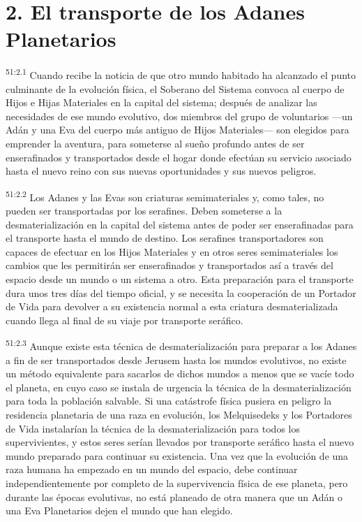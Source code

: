 \section*{2. El transporte de los Adanes Planetarios}
\par
\textsuperscript{51:2.1} Cuando recibe la noticia de que otro mundo habitado ha alcanzado el punto culminante de la evolución física, el Soberano del Sistema convoca al cuerpo de Hijos e Hijas Materiales en la capital del sistema; después de analizar las necesidades de ese mundo evolutivo, dos miembros del grupo de voluntarios ---un Adán y una Eva del cuerpo más antiguo de Hijos Materiales--- son elegidos para emprender la aventura, para someterse al sueño profundo antes de ser enserafinados y transportados desde el hogar donde efectúan su servicio asociado hasta el nuevo reino con sus nuevas oportunidades y sus nuevos peligros.

\par
\textsuperscript{51:2.2} Los Adanes y las Evas son criaturas semimateriales y, como tales, no pueden ser transportadas por los serafines. Deben someterse a la desmaterialización en la capital del sistema antes de poder ser enserafinadas para el transporte hasta el mundo de destino. Los serafines transportadores son capaces de efectuar en los Hijos Materiales y en otros seres semimateriales los cambios que les permitirán ser enserafinados y transportados así a través del espacio desde un mundo o un sistema a otro. Esta preparación para el transporte dura unos tres días del tiempo oficial, y se necesita la cooperación de un Portador de Vida para devolver a su existencia normal a esta criatura desmaterializada cuando llega al final de su viaje por transporte seráfico.

\par
\textsuperscript{51:2.3} Aunque existe esta técnica de desmaterialización para preparar a los Adanes a fin de ser transportados desde Jerusem hasta los mundos evolutivos, no existe un método equivalente para sacarlos de dichos mundos a menos que se vacíe todo el planeta, en cuyo caso se instala de urgencia la técnica de la desmaterialización para toda la población salvable. Si una catástrofe física pusiera en peligro la residencia planetaria de una raza en evolución, los Melquisedeks y los Portadores de Vida instalarían la técnica de la desmaterialización para todos los supervivientes, y estos seres serían llevados por transporte seráfico hasta el nuevo mundo preparado para continuar su existencia. Una vez que la evolución de una raza humana ha empezado en un mundo del espacio, debe continuar independientemente por completo de la supervivencia física de ese planeta, pero durante las épocas evolutivas, no está planeado de otra manera que un Adán o una Eva Planetarios dejen el mundo que han elegido.

